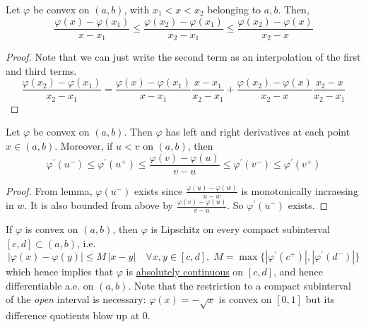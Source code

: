   \begin{lemma}
    \label{thm:chorded-slope-lemma}
    Let $\varphi$ be convex on $(a, b)$, with $x_1 < x < x_2$ belonging to $a, b$. Then, 
    \begin{equation}
      \frac{\varphi(x) - \varphi(x_1)}{x - x_1} \leq \frac{\varphi(x_2) - \varphi(x_1)}{x_2 - x_1} \leq \frac{\varphi(x_2) - \varphi(x)}{x_2 - x} 
    \end{equation}
  \end{lemma}
  \begin{proof}
    Note that we can just write the second term as an interpolation of the first and third terms. 
    \begin{equation}
      \frac{\varphi(x_2) - \varphi(x_1)}{x_2 - x_1} = \frac{\varphi(x) - \varphi(x_1)}{x - x_1} \frac{x - x_1}{x_2 - x_1} + \frac{\varphi(x_2) - \varphi(x)}{x_2 - x} \frac{x_2 - x}{x_2 - x_1}
    \end{equation}
  \end{proof}

  \begin{theorem}
    \label{thm:one-sided-derivatives-of-a-convex-function}
    Let $\varphi$ be convex on $(a, b)$. Then $\varphi$ has left and right derivatives at each point $x \in (a, b)$. Moreover, if $u < v$ on $(a, b)$, then 
    \begin{equation}
      \varphi^\prime (u^-) \leq \varphi^\prime (u^+) \leq \frac{\varphi(v) - \varphi(u)}{v - u} \leq \varphi^\prime (v^-) \leq \varphi^\prime (v^+)
    \end{equation}
  \end{theorem}
  \begin{proof}
    From lemma, $\varphi(u^-)$ exists since $\frac{\varphi(u) - \varphi(w)}{u - w}$ is monotonically incraesing in $w$. It is also bounded from above by $\frac{\varphi(v) - \varphi(u)}{v - u}$. So $\varphi^\prime(u^-)$ exists. 
  \end{proof}


  \begin{corollary}
    \label{thm:local-lipschitz-property-of-convex-functions}
    If $\varphi$ is convex on $(a, b)$, then $\varphi$ is Lipschitz on every compact subinterval $[c, d] \subset (a, b)$, i.e.
    \begin{equation}
      | \varphi(x) - \varphi(y)| \leq M \, |x - y|  \quad \forall x, y \in [c, d], \; M = \max\{ |\varphi^\prime (c^+)|, | \varphi^\prime (d^-)| \}
    \end{equation}
    which hence implies that $\varphi$ is \hyperref[def:absolutely-continuous-function]{absolutely continuous} on $[c, d]$, and hence differentiable a.e. on $(a, b)$. Note that the restriction to a compact subinterval of the \textit{open} interval is necessary: $\varphi(x) = -\sqrt{x}$ is convex on $[0, 1]$ but its difference quotients blow up at $0$.
  \end{corollary}

